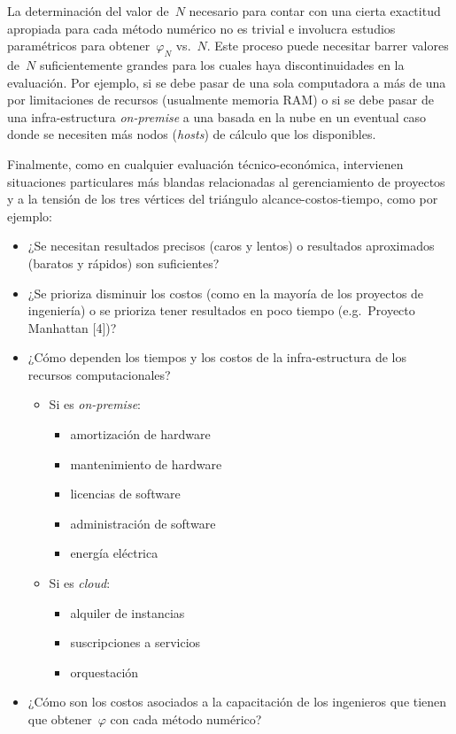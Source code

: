 \documentclass[
  12pt,
  a4paper,
  table]{scrbook}
\providecommand{\tightlist}{%
  \setlength{\itemsep}{0pt}\setlength{\parskip}{0pt}}\usepackage{longtable,booktabs,array}
\theoremstyle{plain}
\theoremstyle{definition}
\theoremstyle{plain}
\theoremstyle{plain}
\theoremstyle{remark}
\begin{document}
La determinación del valor de~\(N\) necesario para contar con una cierta
exactitud apropiada para cada método numérico no es trivial e involucra
estudios paramétricos para obtener~\(\varphi_N\) vs.~\(N\). Este proceso
puede necesitar barrer valores de~\(N\) suficientemente grandes para los
cuales haya discontinuidades en la evaluación. Por ejemplo, si se debe
pasar de una sola computadora a más de una por limitaciones de recursos
(usualmente memoria RAM) o si se debe pasar de una infra-estructura
\emph{on-premise} a una basada en la nube en un eventual caso donde se
necesiten más nodos (\foreignlanguage{american}{\emph{hosts}}) de
cálculo que los disponibles.

Finalmente, como en cualquier evaluación técnico-económica, intervienen
situaciones particulares más blandas relacionadas al gerenciamiento de
proyectos y a la tensión de los tres vértices del triángulo
alcance-costos-tiempo, como por ejemplo:

\begin{itemize}
\tightlist
\item
  ¿Se necesitan resultados precisos (caros y lentos) o resultados
  aproximados (baratos y rápidos) son suficientes?
\item
  ¿Se prioriza disminuir los costos (como en la mayoría de los proyectos
  de ingeniería) o se prioriza tener resultados en poco tiempo
  (e.g.~Proyecto Manhattan {[}4{]})?
\item
  ¿Cómo dependen los tiempos y los costos de la infra-estructura de los
  recursos computacionales?

  \begin{itemize}
  \tightlist
  \item
    Si es \emph{on-premise}:

    \begin{itemize}
    \tightlist
    \item
      amortización de hardware
    \item
      mantenimiento de hardware
    \item
      licencias de software
    \item
      administración de software
    \item
      energía eléctrica
    \end{itemize}
  \item
    Si es \emph{cloud}:

    \begin{itemize}
    \tightlist
    \item
      alquiler de instancias
    \item
      suscripciones a servicios
    \item
      orquestación
    \end{itemize}
  \end{itemize}
\item
  ¿Cómo son los costos asociados a la capacitación de los ingenieros que
  tienen que obtener~\(\varphi\) con cada método numérico?
\end{itemize}
\end{document}
